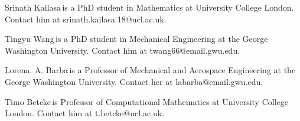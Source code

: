\documentclass{IEEEcsmag}
\begin{document}
\begin{IEEEbiography}{Srinath Kailasa}{\,}is a PhD student in Mathematics at University College London. Contact him at srinath.kailasa.18@ucl.ac.uk.
\end{IEEEbiography}

\begin{IEEEbiography}{Tingyu Wang}{\,}is a PhD student in Mechanical Engineering at the George Washington University. Contact him at twang66@email.gwu.edu.
\end{IEEEbiography}

\begin{IEEEbiography}{Lorena. A. Barba}{\,}is a Professor of Mechanical and Aerospace Engineering at the George Washington University.  Contact her at labarba@email.gwu.edu.
\end{IEEEbiography}

\begin{IEEEbiography}{Timo Betcke}{\,}is Professor of Computational Mathematics at University College London. Contact him at t.betcke@ucl.ac.uk.
\end{IEEEbiography}
\end{document}
